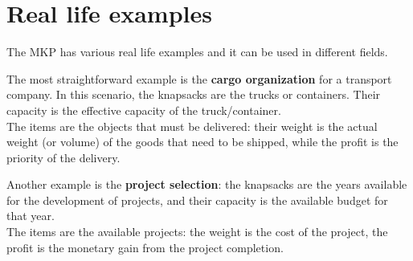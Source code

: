 \section{Real life examples}
The MKP has various real life examples and it can be used in different fields.

The most straightforward example is the \textbf{cargo organization} for a transport company.
In this scenario, the knapsacks are the trucks or containers.
Their capacity is the effective capacity of the truck/container.\\
The items are the objects that must be delivered:
their weight is the actual weight (or volume) of the goods that need to be shipped, while the profit is the priority of the delivery.

Another example is the \textbf{project selection}: the knapsacks are
the years available for the development of projects,
and their capacity is the available budget for that year.\\
The items are the available projects: the weight is the cost of the project, the profit is the monetary gain
from the project completion.